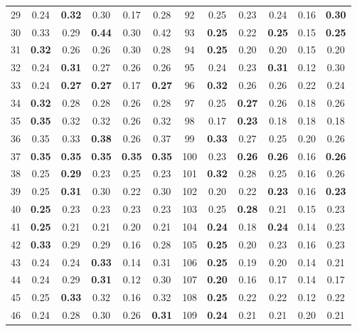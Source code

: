 \documentclass{article}
\begin{document}
{\begin{longtable}{cccccc@{\qquad}cccccc}
29 & 0.24 & \textbf{0.32} & 0.30 & 0.17 & 0.28 & 92 & 0.25 & 0.23 & 0.24 & 0.16 & \textbf{0.30} \\
30 & 0.33 & 0.29 & \textbf{0.44} & 0.30 & 0.42 & 93 & \textbf{0.25} & 0.22 & \textbf{0.25} & 0.15 & \textbf{0.25} \\
31 & \textbf{0.32} & 0.26 & 0.26 & 0.30 & 0.28 & 94 & \textbf{0.25} & 0.20 & 0.20 & 0.15 & 0.20 \\
32 & 0.24 & \textbf{0.31} & 0.27 & 0.26 & 0.26 & 95 & 0.24 & 0.23 & \textbf{0.31} & 0.12 & 0.30 \\
33 & 0.24 & \textbf{0.27} & \textbf{0.27} & 0.17 & \textbf{0.27} & 96 & \textbf{0.32} & 0.26 & 0.26 & 0.22 & 0.24 \\
34 & \textbf{0.32} & 0.28 & 0.28 & 0.26 & 0.28 & 97 & 0.25 & \textbf{0.27} & 0.26 & 0.18 & 0.26 \\
35 & \textbf{0.35} & 0.32 & 0.32 & 0.26 & 0.32 & 98 & 0.17 & \textbf{0.23} & 0.18 & 0.18 & 0.18 \\
36 & 0.35 & 0.33 & \textbf{0.38} & 0.26 & 0.37 & 99 & \textbf{0.33} & 0.27 & 0.25 & 0.20 & 0.26 \\
37 & \textbf{0.35} & \textbf{0.35} & \textbf{0.35} & \textbf{0.35} & \textbf{0.35} & 100 & 0.23 & \textbf{0.26} & \textbf{0.26} & 0.16 & \textbf{0.26} \\
38 & 0.25 & \textbf{0.29} & 0.23 & 0.25 & 0.23 & 101 & \textbf{0.32} & 0.28 & 0.25 & 0.16 & 0.26 \\
39 & 0.25 & \textbf{0.31} & 0.30 & 0.22 & 0.30 & 102 & 0.20 & 0.22 & \textbf{0.23} & 0.16 & \textbf{0.23} \\
40 & \textbf{0.25} & 0.23 & 0.23 & 0.23 & 0.23 & 103 & 0.25 & \textbf{0.28} & 0.21 & 0.15 & 0.23 \\
41 & \textbf{0.25} & 0.21 & 0.21 & 0.20 & 0.21 & 104 & \textbf{0.24} & 0.18 & \textbf{0.24} & 0.14 & 0.23 \\
42 & \textbf{0.33} & 0.29 & 0.29 & 0.16 & 0.28 & 105 & \textbf{0.25} & 0.20 & 0.23 & 0.16 & 0.23 \\
43 & 0.24 & 0.24 & \textbf{0.33} & 0.14 & 0.31 & 106 & \textbf{0.25} & 0.19 & 0.20 & 0.14 & 0.21 \\
44 & 0.24 & 0.29 & \textbf{0.31} & 0.12 & 0.30 & 107 & \textbf{0.20} & 0.16 & 0.17 & 0.14 & 0.17 \\
45 & 0.25 & \textbf{0.33} & 0.32 & 0.16 & 0.32 & 108 & \textbf{0.25} & 0.22 & 0.22 & 0.12 & 0.22 \\
46 & 0.24 & 0.28 & 0.30 & 0.26 & \textbf{0.31} & 109 & \textbf{0.24} & 0.21 & 0.21 & 0.20 & 0.21 \\

\end{longtable}}
\end{document}
